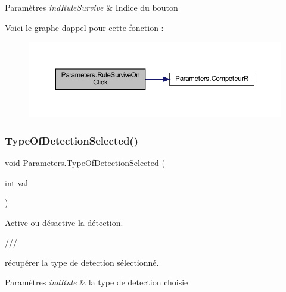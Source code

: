 \begin{DoxyParams}{Paramètres}
{\em ind\+Rule\+Survive} & Indice du bouton\\
\hline
\end{DoxyParams}
Voici le graphe d\textquotesingle{}appel pour cette fonction \+:
\nopagebreak
\begin{figure}[H]
\begin{center}
\leavevmode
\includegraphics[width=350pt]{class_parameters_af62c0383d55e0653fcd2384b9d49d42f_cgraph}
\end{center}
\end{figure}
\mbox{\label{class_parameters_aea7e3963fed0681d7a9f756a5deb52d1}} 
\subsubsection{\texorpdfstring{Type\+Of\+Detection\+Selected()}{TypeOfDetectionSelected()}}
{\footnotesize\ttfamily void Parameters.\+Type\+Of\+Detection\+Selected (\begin{DoxyParamCaption}\item[{int}]{val }\end{DoxyParamCaption})\hspace{0.3cm}{\ttfamily [inline]}}



Active ou désactive la détection. 

/// 

récupérer la type de detection sélectionné. 


\begin{DoxyParams}{Paramètres}
{\em ind\+Rule} & la type de detection choisie\\
\hline
\end{DoxyParams}
\mbox{\label{class_parameters_a92f68fa9992b1066153a6175dd37dc36}} 
